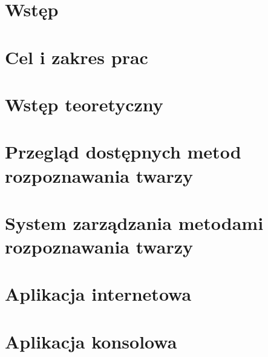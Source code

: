 \documentclass[11pt, a4paper,polish,twoside]{report}
\numberwithin{equation}{section}
\begin{document}



\newpage
\null
\thispagestyle{empty}
\newpage
%



\tableofcontents

\chapter{Wstęp}


\chapter{Cel i zakres prac}


\chapter{Wstęp teoretyczny}


\chapter{Przegląd dostępnych metod rozpoznawania twarzy} %


\chapter{System zarządzania metodami rozpoznawania twarzy}


\chapter{Aplikacja internetowa}


\chapter{Aplikacja konsolowa}

\end{document}
